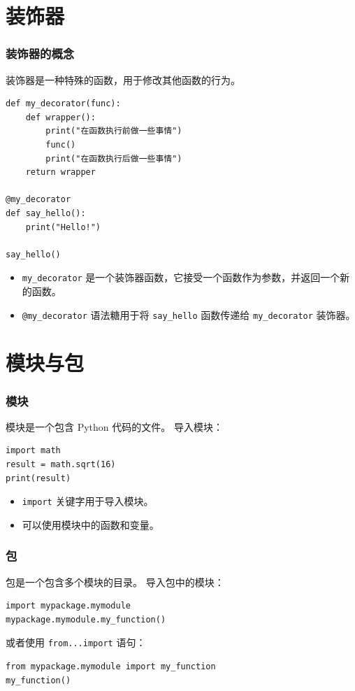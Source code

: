 \section{装饰器}
\begin{frame}[fragile]
    \frametitle{装饰器的概念}
    装饰器是一种特殊的函数，用于修改其他函数的行为。
    \begin{lstlisting}[style=pythonstyle]
def my_decorator(func):
    def wrapper():
        print("在函数执行前做一些事情")
        func()
        print("在函数执行后做一些事情")
    return wrapper

@my_decorator
def say_hello():
    print("Hello!")

say_hello()
    \end{lstlisting}
    \begin{itemize}
        \item \texttt{my\_decorator} 是一个装饰器函数，它接受一个函数作为参数，并返回一个新的函数。
        \item \texttt{@my\_decorator} 语法糖用于将 \texttt{say\_hello} 函数传递给 \texttt{my\_decorator} 装饰器。
    \end{itemize}
\end{frame}
%
\section{模块与包}
\begin{frame}[fragile]
    \frametitle{模块}
    模块是一个包含 Python 代码的文件。
    导入模块：
    \begin{lstlisting}[style=pythonstyle]
import math
result = math.sqrt(16)
print(result)
    \end{lstlisting}
    \begin{itemize}
        \item \texttt{import} 关键字用于导入模块。
        \item 可以使用模块中的函数和变量。
    \end{itemize}
\end{frame}
%
\begin{frame}[fragile]
    \frametitle{包}
    包是一个包含多个模块的目录。
    导入包中的模块：
    \begin{lstlisting}[style=pythonstyle]
import mypackage.mymodule
mypackage.mymodule.my_function()
    \end{lstlisting}
    或者使用 \texttt{from...import} 语句：
    \begin{lstlisting}[style=pythonstyle]
from mypackage.mymodule import my_function
my_function()
    \end{lstlisting}
\end{frame}
%
